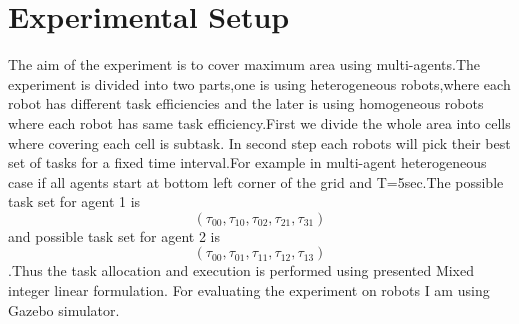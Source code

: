 \documentclass[conference]{IEEEtran}
\begin{document}
\section{Experimental Setup}
The aim of the experiment is to cover maximum area using multi-agents.The experiment is divided into two parts,one is using heterogeneous robots,where each robot has different task efficiencies and the later is using homogeneous robots where each robot has same task efficiency.First we divide the whole area into cells where covering each cell is subtask\cite{flushing2014mathematical}.
In second step each robots will pick their best set of tasks for a fixed time interval.For example in multi-agent heterogeneous case if all agents start at bottom left corner of the grid and T=5sec.The possible task set for agent 1 is \[ (\tau_{00},\tau_{10},\tau_{02},\tau_{21},\tau_{31}) \] and possible task set for agent 2 is \[ (\tau_{00},\tau_{01},\tau_{11},\tau_{12},\tau_{13}) \].Thus the task allocation and execution is performed using presented Mixed integer linear formulation.
For evaluating the experiment on robots I am using Gazebo simulator.



%

\end{document}
